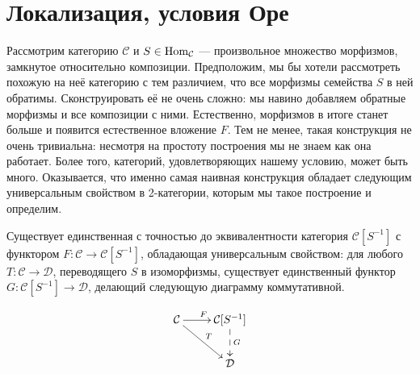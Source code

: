 \documentclass[../hw_main.tex]{subfiles}
\begin{document}
\section{Локализация, условия Оре}

Рассмотрим категорию $\mathcal{C}$ и $S\in \operatorname{Hom}_\mathcal{C}$ --- произвольное множество морфизмов, замкнутое относительно композиции. 
Предположим, мы бы хотели рассмотреть похожую на неё категорию с тем различием, что все морфизмы семейства $S$ в ней обратимы. 
Сконструировать её не очень сложно: мы навино добавляем обратные морфизмы и все композиции с ними. 
Естественно, морфизмов в итоге станет больше и появится естественное вложение $F$. 
Тем не менее, такая конструкция не очень тривиальна: несмотря на простоту построения мы не знаем как она работает. 
Более того, категорий, удовлетворяющих нашему условию, может быть много. 
Оказывается, что именно самая наивная конструкция обладает следующим универсальным свойством в 2-категории, которым мы такое построение и определим.

\begin{to_suj}
  Существует единственная с точностью до эквивалентности категория $\mathcal{C}[S^{-1}]$ с функтором $F:\mathcal{C}\to \mathcal{C}[S^{-1}]$, обладающая универсальным свойством: для любого $T:\mathcal{C}\to \mathcal{D}$, переводящего $S$ в изоморфизмы, существует единственный функтор $G:\mathcal{C}[S^{-1}] \to \mathcal{D}$, делающий следующую диаграмму коммутативной.

  \begin{equation}\label{loc_univ}
  \xymatrix{
      \mathcal{C}\ar[rd]^T \ar[r]^F & \mathcal{C}[S^{-1}]\ar@{-->}[d]^G\\
  & \mathcal{D} }
\end{equation}

\end{to_suj}
\end{document}
